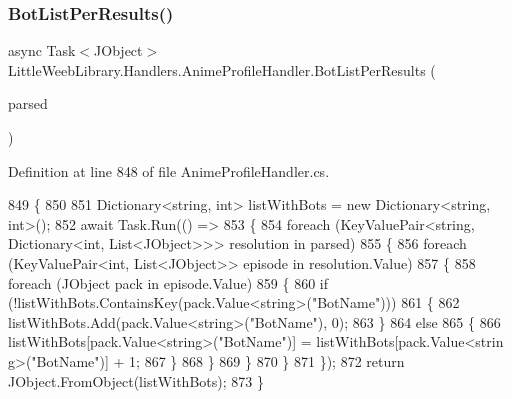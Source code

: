 \subsubsection{\texorpdfstring{Bot\+List\+Per\+Results()}{BotListPerResults()}}
{\footnotesize\ttfamily async Task$<$J\+Object$>$ Little\+Weeb\+Library.\+Handlers.\+Anime\+Profile\+Handler.\+Bot\+List\+Per\+Results (\begin{DoxyParamCaption}\item[{Dictionary$<$ string, Dictionary$<$ int, List$<$ J\+Object $>$$>$$>$}]{parsed }\end{DoxyParamCaption})\hspace{0.3cm}{\ttfamily [private]}}



Definition at line 848 of file Anime\+Profile\+Handler.\+cs.


\begin{DoxyCode}
849         \{
850 
851             Dictionary<string, int> listWithBots = \textcolor{keyword}{new} Dictionary<string, int>();
852             await Task.Run(() =>
853             \{
854                 \textcolor{keywordflow}{foreach} (KeyValuePair<\textcolor{keywordtype}{string}, Dictionary<\textcolor{keywordtype}{int}, List<JObject>>> resolution \textcolor{keywordflow}{in} parsed)
855                 \{
856                     \textcolor{keywordflow}{foreach} (KeyValuePair<\textcolor{keywordtype}{int}, List<JObject>> episode \textcolor{keywordflow}{in} resolution.Value)
857                     \{
858                         foreach (JObject pack in episode.Value)
859                         \{
860                             if (!listWithBots.ContainsKey(pack.Value<string>(\textcolor{stringliteral}{"BotName"})))
861                             \{
862                                 listWithBots.Add(pack.Value<string>(\textcolor{stringliteral}{"BotName"}), 0);
863                             \}
864                             else
865                             \{
866                                 listWithBots[pack.Value<string>(\textcolor{stringliteral}{"BotName"})] = listWithBots[pack.Value<strin
      g>(\textcolor{stringliteral}{"BotName"})] + 1;
867                             \}
868                         \}
869                     \}
870                 \}
871             \});           
872             \textcolor{keywordflow}{return} JObject.FromObject(listWithBots);
873         \}
\end{DoxyCode}
\mbox{\label{class_little_weeb_library_1_1_handlers_1_1_anime_profile_handler_a132e4da0f082cc2c967cd06eaac3337b}} 
